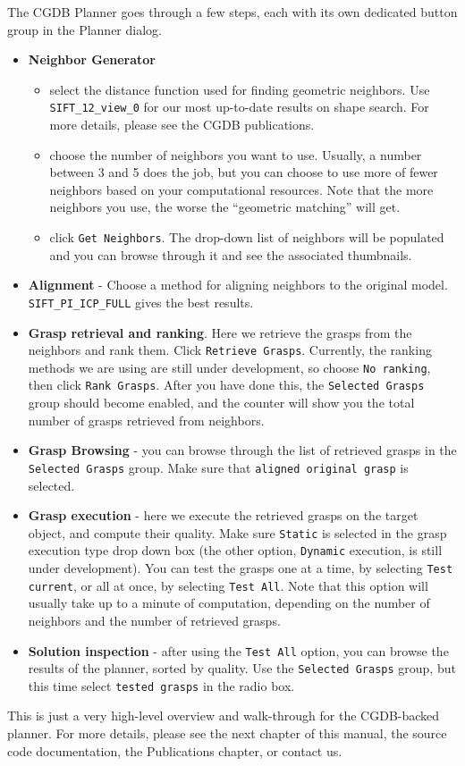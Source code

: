 The CGDB Planner goes through a few steps, each with its own dedicated
button group in the Planner dialog.
\begin{itemize}
\item \textbf{Neighbor Generator}
\begin{itemize}
  \item select the distance function used for finding geometric
    neighbors. Use \texttt{SIFT\_12\_view\_0} for our most up-to-date
    results on shape search. For more details, please see the CGDB
    publications.
  \item choose the number of neighbors you want to use. Usually, a
    number between 3 and 5 does the job, but you can choose to use
    more of fewer neighbors based on your computational
    resources. Note that the more neighbors you use, the worse the
    ``geometric matching'' will get.
  \item click \texttt{Get Neighbors}. The drop-down list of neighbors
    will be populated and you can browse through it and see the
    associated thumbnails.
\end{itemize}
\item \textbf{Alignment} - Choose a method for aligning neighbors to
  the original model. \texttt{SIFT\_PI\_ICP\_FULL} gives the best
  results.
\item \textbf{Grasp retrieval and ranking}. Here we retrieve the
  grasps from the neighbors and rank them. Click \texttt{Retrieve
    Grasps}. Currently, the ranking methods we are using are still
  under development, so choose \texttt{No ranking}, then click
  \texttt{Rank Grasps}. After you have done this, the \texttt{Selected
    Grasps} group should become enabled, and the counter will show you
  the total number of grasps retrieved from neighbors.
\item \textbf{Grasp Browsing} - you can browse through the list of
  retrieved grasps in the \texttt{Selected Grasps} group. Make sure
  that \texttt{aligned original grasp} is selected.
\item \textbf{Grasp execution} - here we execute the retrieved grasps
  on the target object, and compute their quality. Make sure
  \texttt{Static} is selected in the grasp execution type drop down
  box (the other option, \texttt{Dynamic} execution, is still under
  development). You can test the grasps one at a time, by selecting
  \texttt{Test current}, or all at once, by selecting \texttt{Test
    All}. Note that this option will usually take up to a minute of
  computation, depending on the number of neighbors and the number of
  retrieved grasps.
\item \textbf{Solution inspection} - after using the \texttt{Test All}
  option, you can browse the results of the planner, sorted by
  quality. Use the \texttt{Selected Grasps} group, but this time
  select \texttt{tested grasps} in the radio box.
\end{itemize}

This is just a very high-level overview and walk-through for the
CGDB-backed planner. For more details, please see the next chapter of
this manual, the source code documentation, the Publications chapter,
or contact us.
